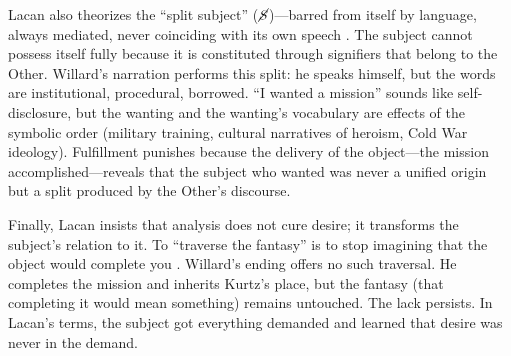 Lacan also theorizes the ``split subject'' ($\cancel{S}$)---barred from itself by language,
always mediated, never coinciding with its own speech \parencite{LacanEcrits2006}. The
subject cannot
possess itself fully because it is constituted through signifiers that belong to the Other.
Willard's narration performs this split: he speaks himself, but the words are institutional,
procedural, borrowed. ``I wanted a mission'' sounds like self-disclosure, but the wanting and
the wanting's vocabulary are effects of the symbolic order (military training, cultural
narratives of heroism, Cold War ideology). Fulfillment punishes because the delivery of the
object---the mission accomplished---reveals that the subject who wanted was never a unified
origin but a split produced by the Other's discourse.

Finally, Lacan insists that analysis does not cure desire; it transforms the subject's relation
to it. To ``traverse the fantasy'' is to stop imagining that the object would complete you
\parencite{LacanSeminarXI1991}. Willard's ending offers no such traversal. He completes the
mission and inherits Kurtz's place, but the fantasy (that completing it would mean something)
remains untouched. The lack persists. In Lacan's terms, the subject got everything demanded
and learned that desire was never in the demand.
